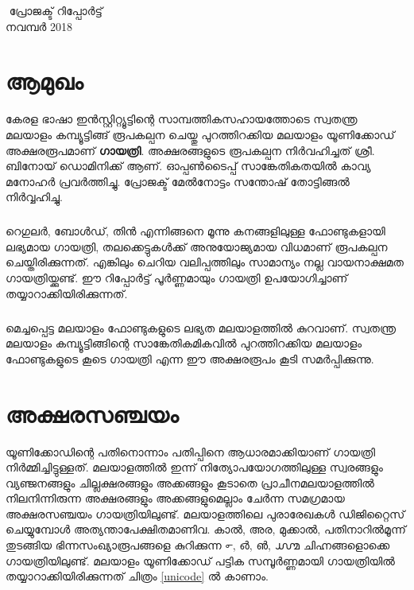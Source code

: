 \documentclass[a4paper, 12pt]{report}
\begin{document}
	
\begin{titlepage}
\BgThispage
\centering
\vfill
{{\Large { ‌ }}}
\vfill
{{\Large {പ്രോജക്ട് റിപ്പോർട്ട് }}}\\[.5cm]
{{\Large {നവമ്പർ 2018}}}\\
\end{titlepage}
 

\thispagestyle{empty}	
\clearpage
	
	\chapter*{ആമുഖം}
	

	കേരള ഭാഷാ ഇന്‍സ്റ്റിറ്റ്യൂട്ടിന്റെ സാമ്പത്തികസഹായത്തോടെ സ്വതന്ത്ര മലയാളം കമ്പ്യൂട്ടിങ്ങ് രൂപകല്പന ചെയ്തു പുറത്തിറക്കിയ മലയാളം യൂണിക്കോഡ് അക്ഷരരൂപമാണ്  \textbf{ഗായത്രി}. അക്ഷരങ്ങളുടെ  രൂപകല്പന നിർവഹിച്ചത് ശ്രീ. ബിനോയ് ഡൊമിനിക്ക് ആണ്. ഓപ്പണ്‍ടൈപ്പ് സാങ്കേതികതയിൽ കാവ്യ മനോഹർ പ്രവർത്തിച്ചു. പ്രോജക്ട് മേല്‍നോട്ടം സന്തോഷ് തോട്ടിങ്ങൽ നിർവ്വഹിച്ചു.
	
	\paragraph{}
	റെഗുലര്‍, ബോള്‍ഡ്, തിന്‍ എന്നിങ്ങനെ മൂന്നു കനങ്ങളിലുള്ള ഫോണ്ടുകളായി ലഭ്യമായ ഗായത്രി, തലക്കെട്ടുകള്‍ക്ക് അനുയോജ്യമായ വിധമാണ് രൂപകല്പന ചെയ്തിരിക്കുന്നത്. എങ്കിലും ചെറിയ വലിപ്പത്തിലും സാമാന്യം നല്ല വായനാക്ഷമത ഗായത്രിയ്ക്കുണ്ട്. ഈ റിപ്പോര്‍ട്ട് പൂര്‍ണ്ണമായും ഗായത്രി  ഉപയോഗിച്ചാണ് തയ്യാറാക്കിയിരിക്കുന്നത്.
	\paragraph{}
	മെച്ചപ്പെട്ട മലയാളം ഫോണ്ടുകളുടെ ലഭ്യത മലയാളത്തിൽ കുറവാണ്. സ്വതന്ത്ര മലയാളം കമ്പ്യൂട്ടിങ്ങിന്റെ സാങ്കേതികമികവിൽ പുറത്തിറക്കിയ  മലയാളം ഫോണ്ടുകളുടെ കൂടെ ഗായത്രി എന്ന ഈ അക്ഷരരൂപം കൂടി സമർപ്പിക്കുന്നു.
\thispagestyle{empty}
\clearpage
	\chapter*{ അക്ഷരസഞ്ചയം}
	

	
	യൂണിക്കോഡിന്റെ പതിനൊന്നാം പതിപ്പിനെ ആധാരമാക്കിയാണ് ഗായത്രി നിര്‍മ്മിച്ചിട്ടുള്ളത്. മലയാളത്തില്‍ ഇന്ന് നിത്യോപയോഗത്തിലുള്ള സ്വരങ്ങളും വ്യഞ്ജനങ്ങളും ചില്ലക്ഷരങ്ങളും അക്കങ്ങളും കൂടാതെ പ്രാചീനമലയാളത്തില്‍ നിലനിന്നിരുന്ന അക്ഷരങ്ങളും അക്കങ്ങളുമെല്ലാം ചേര്‍ന്ന സമഗ്രമായ അക്ഷരസഞ്ചയം ഗായത്രിയിലുണ്ട്. മലയാളത്തിലെ പുരാരേഖകള്‍ ഡിജിറ്റൈസ് ചെയ്യുമ്പോള്‍ അത്യന്താപേക്ഷിതമാണിവ. കാല്‍, അര, മുക്കാല്‍, പതിനാറില്‍മൂന്ന് തുടങ്ങിയ ഭിന്നസംഖ്യാരൂപങ്ങളെ കുറിക്കുന്ന ൳, ൴, ൵, ൸ ചിഹ്നങ്ങളൊക്കെ ഗായത്രിയിലുണ്ട്. മലയാളം യൂണിക്കോഡ് പട്ടിക സമ്പൂർണ്ണമായി ഗായത്രിയിൽ തയ്യാറാക്കിയിരിക്കുന്നത് ചിത്രം \ref{unicode} ല്‍ കാണാം.
	
\end{document}

